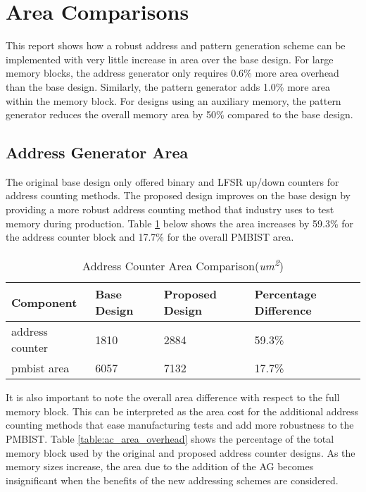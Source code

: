 \section{Area Comparisons}
This report shows how a robust address and pattern generation scheme can be implemented with very little increase in area over the base design.  For large memory blocks, the address generator only requires 0.6\% more area overhead than the base design.  Similarly, the pattern generator adds 1.0\% more area within the memory block.  For designs using an auxiliary memory, the pattern generator reduces the overall memory area by 50\% compared to the base design.

\label{sect:cln-area}
\subsection{Address Generator Area}
The original base design only offered binary and LFSR up/down counters for address counting methods.  The proposed design improves on the base design by providing a more robust address counting method that industry uses to test memory during production.  Table \ref{table:ac_area_compare} below shows the area increases by  59.3\% for the address counter block and 17.7\% for the overall PMBIST area.  

\begin{table}[H]
\caption[Address Counter Area Comparison]{Address Counter Area Comparison(\textit{um\textsuperscript{2}})}
\centering
\begin{tabular}{| l | l | l | l |}
\hline
Component & Base Design & Proposed Design & Percentage Difference \\ [0.5ex]
\hline\hline
address counter & 1810   & 2884   & 59.3\% \\
pmbist area     & 6057   & 7132   & 17.7\% \\ 
\hline
\end{tabular}
\label{table:ac_area_compare}
\end{table}

It is also important to note the overall area difference with respect to the full memory block.  This can be interpreted as the area cost for the additional address counting methods that ease manufacturing tests and add more robustness to the PMBIST.  Table \ref{table:ac_area_overhead} shows the percentage of the total memory block used by the original and proposed address counter designs.  As the memory sizes increase, the area due to the addition of the AG becomes insignificant when the benefits of the new addressing schemes are considered.   

